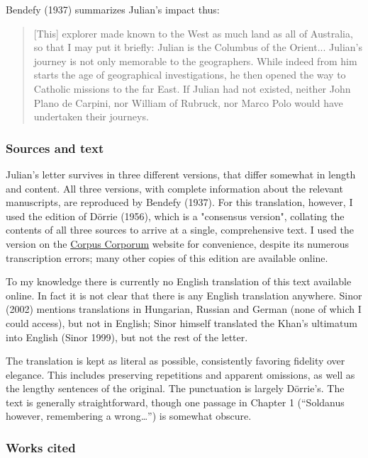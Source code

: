 Bendefy (1937) summarizes Julian's impact thus:

\begin{quote}[This] explorer made known to the West as much land as all of Australia, so that I may put it briefly: Julian is the Columbus of the Orient... Julian's journey is not only memorable to the geographers. While indeed from him starts the age of geographical investigations, he then opened the way to Catholic missions to the far East. If Julian had not existed, neither John Plano de Carpini, nor William of Rubruck, nor Marco Polo would have undertaken their journeys.\end{quote}


\subsubsection{Sources and text}

Julian's letter survives in three different versions, that differ somewhat in length and content. All three versions, with complete information about the relevant manuscripts, are reproduced by Bendefy (1937). For this translation, however, I used the edition of Dörrie (1956), which is a "consensus version", collating the contents of all three sources to arrive at a single, comprehensive text. I used the version on the \href{https://www.mlat.uzh.ch/browser?path=/34/28/17/6}{Corpus Corporum} website for convenience, despite its numerous transcription errors; many other copies of this edition are available online.

To my knowledge there is currently no English translation of this text available online. In fact it is not clear that there is any English translation anywhere. Sinor (2002) mentions translations in Hungarian, Russian and German (none of which I could access), but not in English; Sinor himself translated the Khan's ultimatum into English (Sinor 1999), but not the rest of the letter. 
 
The translation is kept as literal as possible, consistently favoring fidelity over elegance. This includes preserving repetitions and apparent omissions, as well as the lengthy sentences of the original. The punctuation is largely D{\"o}rrie's. The text is generally straightforward, though one passage in Chapter 1 (``Soldanus however, remembering a wrong\ldots'') is somewhat obscure.


\subsubsection{Works cited}

